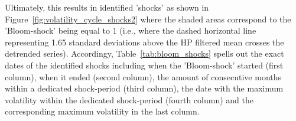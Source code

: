 \documentclass[a4paper,12pt,oneside,pointednumbers,bibtotoc,bigheadings,liststotoc]{scrbook}
\begin{document}
Ultimately, this results in identified 'shocks' as shown in Figure~\ref{fig:volatility_cycle_shocks2} where the shaded areas correspond to the 'Bloom-shock' being equal to $1$ (i.e., where the dashed horizontal line representing 1.65 standard deviations above the HP filtered mean crosses the detrended series). Accordingy, Table~\ref{tab:bloom_shocks} spells out the exact dates of the identified shocks including when the 'Bloom-shock' started (first column), when it ended (second column), the amount of consecutive months within a dedicated shock-period (third column), the date with the maximum volatility within the dedicated shock-period (fourth column) and the corresponding maximum volatility in the last column.


\end{document}
